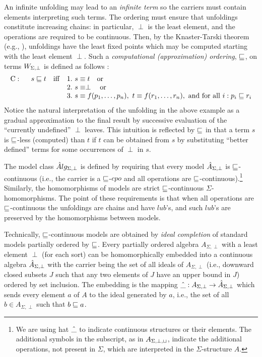 {An infinite unfolding may lead to an {\em infinite term} so the carriers 
must contain elements interpreting such terms.  The ordering must ensure 
that unfoldings constitute increasing chains: in particular, $\perp$ is the 
least element, and the operations are required to be continuous.  Then, by 
the Knaster-Tarski theorem (e.g., \cite{c:75}), unfoldings have the least 
fixed points which may be computed starting with the least element $\perp$.  
Such a {\em computational (approximation) ordering}, $\mathrel{\sqsubseteq}$, on terms 
$W_{{\Sigma,\perp}}$ is defined as follows \cite{c:40, c:77, c:23, c:96, c:15, 
c:97}: \[
\begin{array}{r@{\ \ \ \ \ }l@{\ \ }l}
{\rm C:} & s \cpo t\ \ \ {\rm iff\ } & 1.\ s\syeq t\ \  {\rm\ or} \\
 & & 2.\ s \syeq \perp\ \ {\rm\ or} \\
 & & 3.\ s\syeq f(p_{1},\ldots,p_{n}),\ t\syeq 
 f(r_{1},\ldots,r_{n}),\ {\rm and\ for\ all\ } i : p_{i}\cpo r_{i}
 \end{array}
 \]
Notice the natural interpretation of the unfolding in the above example as a gradual approximation to the 
final result by successive evaluation of the ``currently 
undefined'' $\perp$ leaves. This intuition is reflected by $\mathrel{\sqsubseteq}$ in 
that a term $s$ is $\mathrel{\sqsubseteq}$-less (computed) than $t$ if $t$ can be obtained from $s$ by substituting ``better defined'' terms 
for some occurrences of $\perp$ in $s$.

The model class $\hat Alg_{\Sigma,\perp}$ is defined by requiring
that every model $\hat A_{\Sigma,\perp}$ is $\mathrel{\sqsubseteq}$-continuous (i.e.,
the carrier is a $\mathrel{\sqsubseteq}$-$cpo$ and all operations are
$\mathrel{\sqsubseteq}$-continuous).\footnote{We are using hat $\hat {\_}$ to
indicate continuous structures or their elements. The additional
symbols in the subscript, as in $A_{\Sigma,\perp,\sqcup}$, indicate the
additional operations, not present in $\Sigma$, which are interpreted in
the $\Sigma$-structure $A$.} Similarly, the homomorphisms of models are strict
$\mathrel{\sqsubseteq}$-continuous $\Sigma$-homomorphisms. The point of these
requirements is that when all operations are $\mathrel{\sqsubseteq}$-continuous the
unfoldings are chains and have $lub$'s, and such $lub$'s are preserved
by the homomorphisms between models.

Technically, $\mathrel{\sqsubseteq}$-continuous models are obtained by {\em ideal
completion} \cite{c:75, c:40} of standard models partially ordered by
$\mathrel{\sqsubseteq}$. Every partially ordered algebra $A_{\Sigma,\perp}$ with a
least element $\perp$ (for each sort) can be homomorphically embedded
into a continuous algebra $\hat A_{\Sigma,\perp}$ with the carrier
being the set of all ideals of $A_{\Sigma,\perp}$ (i.e., downward
closed subsets $J$ such that any two elements of $J$ have an upper
bound in $J$) ordered by set inclusion. The embedding is the mapping
${\hat {\_}}:A_{\Sigma,\perp}\mathrel{\rightarrow} \hat A_{\Sigma,\perp}$ which
sends every element $a$ of $A$ to the ideal generated by $a$, i.e.,
the set of all $b\in A_{\Sigma,\perp}$ such that $b\mathrel{\sqsubseteq} a$.
 
}
